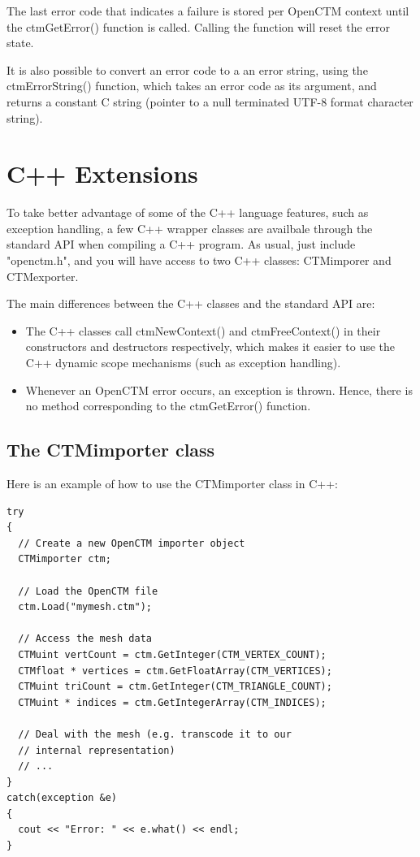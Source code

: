 The last error code that indicates a failure is stored per OpenCTM context
until the ctmGetError() function is called. Calling the function will reset
the error state.

It is also possible to convert an error code to a an error string, using the
ctmErrorString() function, which takes an error code as its argument, and
returns a constant C string (pointer to a null terminated UTF-8 format
character string).




\chapter{C++ Extensions}
To take better advantage of some of the C++ language features, such as
exception handling, a few C++ wrapper classes are availbale through the standard
API when compiling a C++ program. As usual, just include "openctm.h", and you
will have access to two C++ classes: CTMimporer and CTMexporter.

The main differences between the C++ classes and the standard API are:

\begin{itemize}
    \item The C++ classes call ctmNewContext() and ctmFreeContext() in their
          constructors and destructors respectively, which makes it easier to
          use the C++ dynamic scope mechanisms (such as exception handling).
    \item Whenever an OpenCTM error occurs, an exception is thrown. Hence, there
          is no method corresponding to the ctmGetError() function.
\end{itemize}

\section{The CTMimporter class}
Here is an example of how to use the CTMimporter class in C++:

\begin{lstlisting}
try
{
  // Create a new OpenCTM importer object
  CTMimporter ctm;

  // Load the OpenCTM file
  ctm.Load("mymesh.ctm");

  // Access the mesh data
  CTMuint vertCount = ctm.GetInteger(CTM_VERTEX_COUNT);
  CTMfloat * vertices = ctm.GetFloatArray(CTM_VERTICES);
  CTMuint triCount = ctm.GetInteger(CTM_TRIANGLE_COUNT);
  CTMuint * indices = ctm.GetIntegerArray(CTM_INDICES);

  // Deal with the mesh (e.g. transcode it to our
  // internal representation)
  // ...
}
catch(exception &e)
{
  cout << "Error: " << e.what() << endl;
}
\end{lstlisting}


